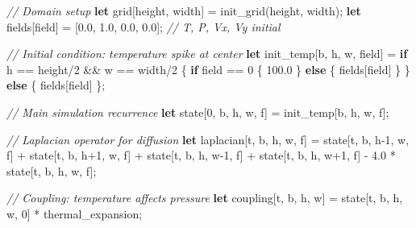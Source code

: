 \documentclass[11pt,]{article}
\newenvironment{Shaded}{}{}
\newcommand{\CommentTok}[1]{\textcolor[rgb]{0.38,0.63,0.69}{\textit{#1}}}
\newcommand{\DecValTok}[1]{\textcolor[rgb]{0.25,0.63,0.44}{#1}}
\newcommand{\KeywordTok}[1]{\textcolor[rgb]{0.00,0.44,0.13}{\textbf{#1}}}
\newcommand{\NormalTok}[1]{#1}
\newcommand{\OperatorTok}[1]{\textcolor[rgb]{0.40,0.40,0.40}{#1}}
\begin{document}
\begin{Shaded}
\begin{Highlighting}[]
\CommentTok{// Domain setup}
\KeywordTok{let}\NormalTok{ grid}\OperatorTok{[}\NormalTok{height, width}\OperatorTok{]}\NormalTok{ = init_grid(height, width);}
\KeywordTok{let}\NormalTok{ fields}\OperatorTok{[}\NormalTok{field}\OperatorTok{]}\NormalTok{ = }\OperatorTok{[}\DecValTok{0.0}\NormalTok{, }\DecValTok{1.0}\NormalTok{, }\DecValTok{0.0}\NormalTok{, }\DecValTok{0.0}\OperatorTok{]}\NormalTok{;   }\CommentTok{// T, P, Vx, Vy initial}

\CommentTok{// Initial condition: temperature spike at center}
\KeywordTok{let}\NormalTok{ init_temp}\OperatorTok{[}\NormalTok{b, h, w, field}\OperatorTok{]}\NormalTok{ = }\KeywordTok{if}\NormalTok{ h == height/}\DecValTok{2}\NormalTok{ && w == width/}\DecValTok{2}
    \OperatorTok{\{} \KeywordTok{if}\NormalTok{ field == }\DecValTok{0} \OperatorTok{\{} \DecValTok{100.0} \OperatorTok{\}} \KeywordTok{else} \OperatorTok{\{}\NormalTok{ fields}\OperatorTok{[}\NormalTok{field}\OperatorTok{]} \OperatorTok{\}} \OperatorTok{\}}
    \KeywordTok{else} \OperatorTok{\{}\NormalTok{ fields}\OperatorTok{[}\NormalTok{field}\OperatorTok{]} \OperatorTok{\}}\NormalTok{;}

\CommentTok{// Main simulation recurrence}
\KeywordTok{let}\NormalTok{ state}\OperatorTok{[}\DecValTok{0}\NormalTok{, b, h, w, f}\OperatorTok{]}\NormalTok{ = init_temp}\OperatorTok{[}\NormalTok{b, h, w, f}\OperatorTok{]}\NormalTok{;}

\CommentTok{// Laplacian operator for diffusion}
\KeywordTok{let}\NormalTok{ laplacian}\OperatorTok{[}\NormalTok{t, b, h, w, f}\OperatorTok{]}\NormalTok{ =}
\NormalTok{    state}\OperatorTok{[}\NormalTok{t, b, h-}\DecValTok{1}\NormalTok{, w, f}\OperatorTok{]}\NormalTok{ +}
\NormalTok{    state}\OperatorTok{[}\NormalTok{t, b, h+}\DecValTok{1}\NormalTok{, w, f}\OperatorTok{]}\NormalTok{ +}
\NormalTok{    state}\OperatorTok{[}\NormalTok{t, b, h, w-}\DecValTok{1}\NormalTok{, f}\OperatorTok{]}\NormalTok{ +}
\NormalTok{    state}\OperatorTok{[}\NormalTok{t, b, h, w+}\DecValTok{1}\NormalTok{, f}\OperatorTok{]}\NormalTok{ -}
    \DecValTok{4.0}\NormalTok{ * state}\OperatorTok{[}\NormalTok{t, b, h, w, f}\OperatorTok{]}\NormalTok{;}

\CommentTok{// Coupling: temperature affects pressure}
\KeywordTok{let}\NormalTok{ coupling}\OperatorTok{[}\NormalTok{t, b, h, w}\OperatorTok{]}\NormalTok{ =}
\NormalTok{    state}\OperatorTok{[}\NormalTok{t, b, h, w, }\DecValTok{0}\OperatorTok{]}\NormalTok{ * thermal_expansion;}


\end{Highlighting}
\end{Shaded}
\end{document}

